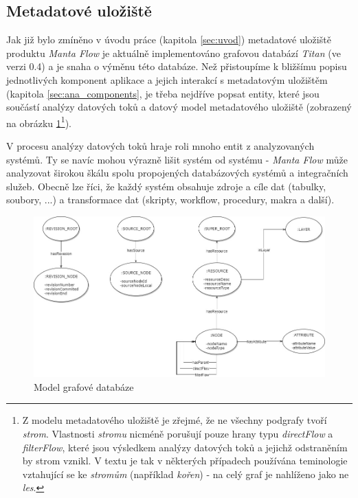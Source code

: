 \subsection{Metadatové uložiště}
\label{sec:ana_model}
Jak již bylo zmíněno v úvodu práce (kapitola \ref{sec:uvod}) metadatové uložiště produktu \textit{Manta Flow} je aktuálně implementováno grafovou databází \textit{Titan} (ve verzi 0.4) a je snaha o výměnu této databáze\cite{Kovar18}. 
Než přistoupíme k bližšímu popisu jednotlivých komponent aplikace a jejich interakcí s metadatovým uložištěm (kapitola \ref{sec:ana_components}, je třeba nejdříve popsat entity, které jsou součástí analýzy datových toků a datový model metadatového uložiště (zobrazený na obrázku \ref{fig:ana-model}\footnote{Z modelu metadatového uložiště je zřejmé, že ne všechny podgrafy tvoří \textit{strom}. Vlastnosti \textit{stromu} nicméně porušují pouze hrany typu \textit{directFlow} a \textit{filterFlow}, které jsou výsledkem analýzy datových toků a jejichž odstraněním by strom vznikl. V textu je tak v některých případech používána teminologie vztahující se ke \textit{stromům} (například \textit{kořen}) - na celý graf je nahlíženo jako ne \textit{les}.}). 

V procesu analýzy datových toků hraje roli mnoho entit z analyzovaných systémů. Ty se navíc mohou výrazně lišit systém od systému - \textit{Manta Flow} může analyzovat širokou škálu spolu propojených databázových systémů a integračních služeb. Obecně lze říci, že každý systém obsahuje zdroje a cíle dat (tabulky, soubory, ...) a transformace dat (skripty, \textit{} workflow, procedury, makra a další).

\begin{figure}
\begin{center}
\includegraphics[width=14cm]{figures/model}
\caption{Model grafové databáze}
\label{fig:ana-model}
\end{center}
\end{figure}

